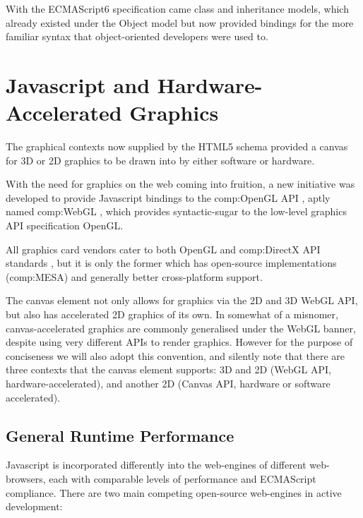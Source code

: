 With the ECMAScript6 specification came class and inheritance models, which already existed under the Object model but now provided bindings for the more familiar syntax that object-oriented developers were used to.


\section{Javascript and Hardware-Accelerated Graphics}

The graphical contexts now supplied by the HTML5 schema provided a canvas for 3D or 2D graphics to be drawn into by either software or hardware.

With the need for graphics on the web coming into fruition, a new initiative was developed to provide Javascript bindings to the \gls{comp:OpenGL} API \cite{opengl}, aptly named \gls{comp:WebGL} \cite{webgl}, which provides syntactic-sugar to the low-level graphics API specification OpenGL.

All graphics card vendors cater to both OpenGL and \gls{comp:DirectX} API standards \cite{directx}, but it is only the former which has open-source implementations (\gls{comp:MESA}) and generally better cross-platform support. 

The canvas element not only allows for graphics via the 2D and 3D WebGL API, but also has accelerated 2D graphics of its own. In somewhat of a misnomer, canvas-accelerated graphics are commonly generalised under the WebGL banner, despite using very different APIs to render graphics. However for the purpose of conciseness we will also adopt this convention, and silently note that there are three contexts that the canvas element supports: 3D and 2D (WebGL API, hardware-accelerated), and another 2D (Canvas API, hardware or software accelerated).

\subsection{General Runtime Performance}

Javascript is incorporated differently into the web-engines of different web-browsers, each with comparable levels of performance and ECMAScript compliance. There are two main competing open-source web-engines in active development:

\begin{description}
\end{description}


